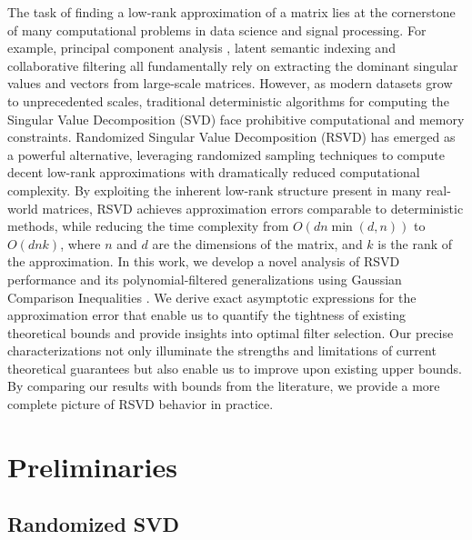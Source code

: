 \documentclass[conference]{IEEEtran}
\newcommand{\rk}[1]{\operatorname{rank}(#1)}
\newcommand{\hA}{\hat{\bA}}
\newcommand{\bA}{\mathbf{A}}
\newcommand{\bbR}{\mathbb{R}}
\begin{document}
The task of finding a low-rank approximation of a matrix lies at the cornerstone of many computational problems in data science and signal processing. For example, principal component analysis  \cite{jolliffe2002principal}, latent semantic indexing \cite{berry1995using} and collaborative filtering \cite{koren2009matrix} all fundamentally rely on extracting the dominant singular values and vectors from large-scale matrices. However, as modern datasets grow to unprecedented scales, traditional deterministic algorithms for computing the Singular Value Decomposition (SVD) face prohibitive computational and memory constraints. Randomized Singular Value Decomposition (RSVD) \cite{halko2011finding, tropp2023randomized} has emerged as a powerful alternative, leveraging randomized sampling techniques to compute decent low-rank approximations with dramatically reduced computational complexity. By exploiting the inherent low-rank structure present in many real-world matrices, RSVD achieves approximation errors comparable to deterministic methods, while reducing the time complexity from $O(dn \min(d,n))$ to $O(dnk)$, where $n$ and $d$ are the dimensions of the matrix, and $k$ is the rank of the approximation. In this work, we develop a novel analysis of RSVD performance and its polynomial-filtered generalizations using Gaussian Comparison Inequalities \cite{Gordon1985SomeIF, Gordon88}. We derive exact asymptotic expressions for the approximation error that enable us to quantify the tightness of existing theoretical bounds and provide insights into optimal filter selection. Our precise characterizations not only illuminate the strengths and limitations of current theoretical guarantees but also enable us to improve upon existing upper bounds. By comparing our results with bounds from the literature, we provide a more complete picture of RSVD behavior in practice.



\section{Preliminaries}

\subsection{Randomized SVD}

\end{document}
